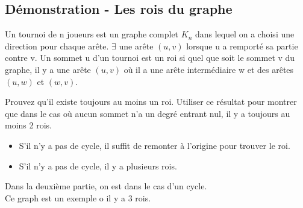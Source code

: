 \subsection{Démonstration - Les rois du graphe}
Un tournoi de n joueurs est un graphe complet $K_{n}$ dans lequel on a choisi une direction pour chaque arête. $\exists$ une arête $(u,v)$ lorsque u a remporté sa partie contre v. Un sommet u d'un tournoi est un roi si quel que soit le sommet v du graphe, il y a une arête $(u,v)$ où il a une arête intermédiaire w et des arêtes $(u,w)$ et $(w,v)$.

Prouvez qu'il existe toujours au moins un roi.
Utiliser ce résultat pour montrer que dans le cas où aucun sommet n'a un degré entrant nul, il y a toujours au moins 2 rois.
\begin{solution}
\begin{itemize}
\item S'il n'y a pas de cycle, il suffit de remonter à l'origine pour trouver le roi.
\item S'il n'y a pas de cycle, il y a plusieurs rois. 
\end{itemize}

Dans la deuxième partie, on est dans le cas d'un cycle.\\Ce graph est un exemple o il y a 3 rois.

\end{solution}

